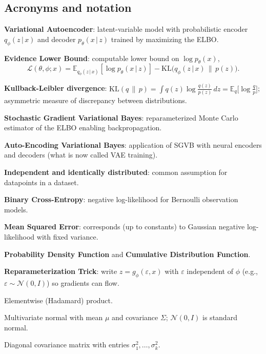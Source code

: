 \documentclass[11pt]{article}
\newcommand{\E}{\mathbb{E}}
\newcommand{\KL}{\mathrm{KL}}
\newcommand{\given}{\,\vert\,}
\theoremstyle{remark}
\begin{document}
\subsection{Acronyms and notation}
\begin{description}[style=nextline,leftmargin=1.8em,labelsep=0.6em]
  \item[VAE] \textbf{Variational Autoencoder}: latent-variable model with probabilistic encoder $q_\phi(z\given x)$ and decoder $p_\theta(x\given z)$ trained by maximizing the ELBO.
  \item[ELBO] \textbf{Evidence Lower Bound}: computable lower bound on $\log p_\theta(x)$,
  \[
  \mathcal L(\theta,\phi;x) = \E_{q_\phi(z\given x)}[\log p_\theta(x\given z)] - \KL\!\big(q_\phi(z\given x)\,\|\,p(z)\big).
  \]
  \item[KL] \textbf{Kullback-Leibler divergence}: $\KL(q\,\|\,p)=\int q(z)\log\frac{q(z)}{p(z)}\,dz=\E_q\!\big[\log \tfrac{q}{p}\big]$; asymmetric measure of discrepancy between distributions.
  \item[SGVB] \textbf{Stochastic Gradient Variational Bayes}: reparameterized Monte Carlo estimator of the ELBO enabling backpropagation.
  \item[AEVB] \textbf{Auto-Encoding Variational Bayes}: application of SGVB with neural encoders and decoders (what is now called VAE training).
  \item[i.i.d.] \textbf{Independent and identically distributed}: common assumption for datapoints in a dataset.
  \item[BCE] \textbf{Binary Cross-Entropy}: negative log-likelihood for Bernoulli observation models.
  \item[MSE] \textbf{Mean Squared Error}: corresponds (up to constants) to Gaussian negative log-likelihood with fixed variance.
  \item[PDF/CDF] \textbf{Probability Density Function} and \textbf{Cumulative Distribution Function}.
  \item[RT] \textbf{Reparameterization Trick}: write $z=g_\phi(\varepsilon,x)$ with $\varepsilon$ independent of $\phi$ (e.g., $\varepsilon\sim\mathcal N(0,I)$) so gradients can flow.
  \item[$\odot$] Elementwise (Hadamard) product.
  \item[$\mathcal N(\mu,\Sigma)$] Multivariate normal with mean $\mu$ and covariance $\Sigma$; $\mathcal N(0,I)$ is standard normal.
  \item[$\mathrm{diag}(\sigma^2)$] Diagonal covariance matrix with entries $\sigma_1^2,\dots,\sigma_k^2$.

\end{description}
\end{document}
